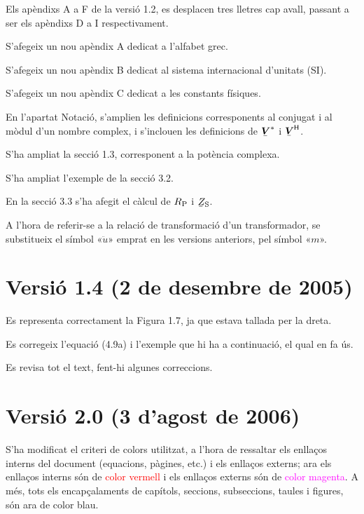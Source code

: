 Els apèndixs A a F de la versió 1.2, es desplacen tres lletres cap
avall, passant a ser els apèndixs D a I respectivament.

S'afegeix un nou apèndix A dedicat a l'alfabet grec.

S'afegeix un nou apèndix B dedicat al sistema internacional
d'unitats (SI).

S'afegeix un nou apèndix C dedicat a les constants físiques.

En l'apartat Notació, s'amplien les definicions corresponents al
conjugat i al mòdul d'un nombre complex, i s'inclouen les
definicions de $\mcmplx{V}^*$ i $\hermit{V}$.

S'ha ampliat la secció 1.3, corresponent a la
potència complexa.

 S'ha ampliat l'exemple de la secció 3.2.

En la secció 3.3 s'ha afegit el càlcul de $R_\mathrm{P}$ i
$\cmplx{Z}\ped{S}$.

 A l'hora de referir-se a la
relació de transformació d'un transformador, se substitueix el
símbol «$\ddot{u}$» emprat en les versions anteriors, pel símbol
«$m$».

\section*{Versió 1.4 (2 de desembre de 2005)}

Es representa correctament la Figura 1.7, ja que estava
tallada per la dreta.

Es corregeix l'equació (4.9a) i l'exemple que hi
ha a continuació, el qual en fa ús.

Es revisa tot el text, fent-hi algunes correccions.

\section*{Versió 2.0 (3 d'agost de 2006)}

S'ha modificat el criteri de colors utilitzat, a l'hora de ressaltar
els enllaços interns del document (equacions, pàgines, etc.) i els
enllaços externs; ara els enllaços interns són de
\textcolor{red}{color vermell} i els enllaços externs són de
\textcolor{magenta}{color magenta}. A més, tots els encapçalaments
de capítols, seccions,
 subseccions, taules  i figures, són ara de
 \textcolor{NavyBlue}{color blau}.

